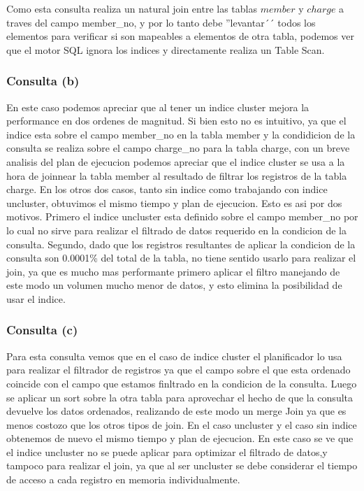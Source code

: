 Como esta consulta realiza un natural join entre las tablas $member$ y $charge$ a traves del campo member\_no, y por lo tanto debe ''levantar´´ todos los elementos para verificar si son mapeables a elementos de otra tabla, podemos ver que el motor SQL ignora los indices y directamente realiza un Table Scan.
 
 \subsubsection{Consulta (b)}
 
 En este caso podemos apreciar que al tener un indice cluster mejora la performance en dos ordenes de magnitud. Si bien esto no es intuitivo, ya que el indice esta sobre el campo member_no en la tabla member y la condidicion de la consulta se realiza sobre el campo charge\_no para la tabla charge, con un breve analisis del plan de ejecucion podemos apreciar que el indice cluster se usa a la hora de joinnear la tabla member al resultado de filtrar los registros de la tabla charge. 
 En los otros dos casos, tanto sin indice como trabajando con indice uncluster, obtuvimos el mismo tiempo y plan de ejecucion. Esto es asi por dos motivos. Primero el indice uncluster esta definido sobre el campo member\_no por lo cual no sirve para realizar el filtrado de datos requerido en la condicion de la consulta. Segundo, dado que los registros resultantes de aplicar la condicion de la consulta son 0.0001\% del total de la tabla, no tiene sentido usarlo para realizar el join, ya que es mucho mas performante primero aplicar el filtro manejando de este modo un volumen mucho menor de datos, y esto elimina la posibilidad de usar el indice.
 
 \subsubsection{Consulta (c)}
 
 Para esta consulta vemos que en el caso de indice cluster el planificador lo usa para realizar el filtrador de registros ya que el campo sobre el que esta ordenado coincide con el campo que estamos finltrado en la condicion de la consulta. Luego se aplicar un sort sobre la otra tabla para aprovechar el hecho de que la consulta devuelve los datos ordenados, realizando de este modo un merge Join ya que es menos costozo que los otros tipos de join. En el caso uncluster y el caso sin indice obtenemos de nuevo el mismo tiempo y plan de ejecucion. En este caso se ve que el indice uncluster no se puede aplicar para optimizar el filtrado de datos,y tampoco para realizar el join, ya que al ser uncluster se debe considerar el tiempo de acceso a cada registro en memoria individualmente. 
 
